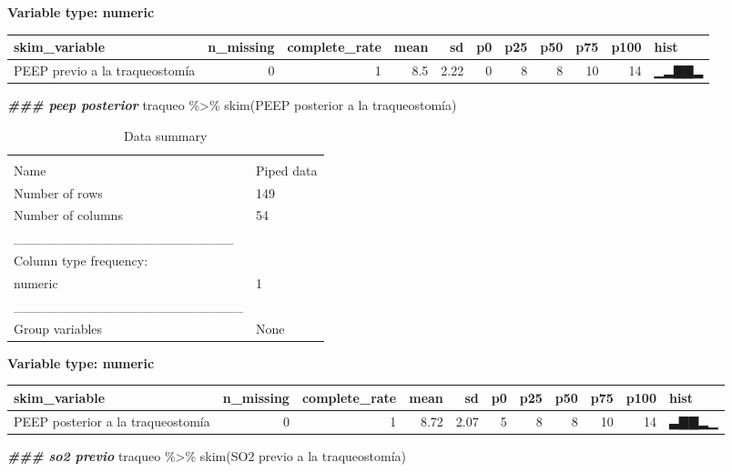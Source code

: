 \documentclass[
]{article}
\newenvironment{Shaded}{\begin{snugshade}}{\end{snugshade}}
\newcommand{\AttributeTok}[1]{\textcolor[rgb]{0.77,0.63,0.00}{#1}}
\newcommand{\DocumentationTok}[1]{\textcolor[rgb]{0.56,0.35,0.01}{\textbf{\textit{#1}}}}
\newcommand{\FunctionTok}[1]{\textcolor[rgb]{0.00,0.00,0.00}{#1}}
\newcommand{\NormalTok}[1]{#1}
\newcommand{\SpecialCharTok}[1]{\textcolor[rgb]{0.00,0.00,0.00}{#1}}
\newcommand{\StringTok}[1]{\textcolor[rgb]{0.31,0.60,0.02}{#1}}
\begin{document}
\textbf{Variable type: numeric}

\begin{longtable}[]{@{}lrrrrrrrrrl@{}}
\toprule
skim\_variable & n\_missing & complete\_rate & mean & sd & p0 & p25 &
p50 & p75 & p100 & hist \\
\midrule
\endhead
PEEP previo a la traqueostomía & 0 & 1 & 8.5 & 2.22 & 0 & 8 & 8 & 10 &
14 & ▁▂▇▇▂ \\
\bottomrule
\end{longtable}

\begin{Shaded}
\begin{Highlighting}[]
\DocumentationTok{\#\#\# peep posterior}
\NormalTok{traqueo }\SpecialCharTok{\%\textgreater{}\%}
  \FunctionTok{skim}\NormalTok{(}\StringTok{\textasciigrave{}}\AttributeTok{PEEP posterior a la traqueostomía}\StringTok{\textasciigrave{}}\NormalTok{)}
\end{Highlighting}
\end{Shaded}

\begin{longtable}[]{@{}ll@{}}
\caption{Data summary}\tabularnewline
\toprule
& \\
\midrule
\endfirsthead
\toprule
& \\
\midrule
\endhead
Name & Piped data \\
Number of rows & 149 \\
Number of columns & 54 \\
\_\_\_\_\_\_\_\_\_\_\_\_\_\_\_\_\_\_\_\_\_\_\_ & \\
Column type frequency: & \\
numeric & 1 \\
\_\_\_\_\_\_\_\_\_\_\_\_\_\_\_\_\_\_\_\_\_\_\_\_ & \\
Group variables & None \\
\bottomrule
\end{longtable}

\textbf{Variable type: numeric}

\begin{longtable}[]{@{}lrrrrrrrrrl@{}}
\toprule
skim\_variable & n\_missing & complete\_rate & mean & sd & p0 & p25 &
p50 & p75 & p100 & hist \\
\midrule
\endhead
PEEP posterior a la traqueostomía & 0 & 1 & 8.72 & 2.07 & 5 & 8 & 8 & 10
& 14 & ▃▇▇▂▁ \\
\bottomrule
\end{longtable}

\begin{Shaded}
\begin{Highlighting}[]
\DocumentationTok{\#\#\# so2 previo}
\NormalTok{traqueo }\SpecialCharTok{\%\textgreater{}\%}
  \FunctionTok{skim}\NormalTok{(}\StringTok{\textasciigrave{}}\AttributeTok{SO2 previo a la traqueostomía}\StringTok{\textasciigrave{}}\NormalTok{)}
\end{Highlighting}
\end{Shaded}
\end{document}
